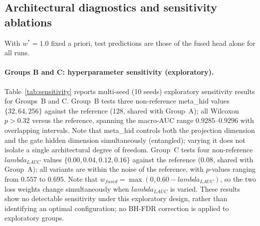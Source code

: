 \documentclass[mathematics,article,pdftex]{Definitions/mdpi}
\def\texttt#1{#1}%
\def\mathrm#1{#1}%
\def\lambda{lambda }%
\begin{document}
\subsection{Architectural diagnostics and sensitivity ablations}
\label{sec:sensitivity}
With $w^{\ast}{=}1.0$ fixed a priori, test predictions are those of the fused head alone for all runs.

\paragraph{Groups B and C: hyperparameter sensitivity (exploratory).}
Table~\ref{tab:sensitivity} reports multi-seed (10 seeds) exploratory sensitivity results for Groups~B and C. Group~B tests three non-reference \texttt{meta\_hid} values $\{32, 64, 256\}$ against the reference (128, shared with Group~A); all Wilcoxon $p{>}0.32$ versus the reference, spanning the macro-AUC range $0.9285$--$0.9296$ with overlapping intervals. Note that \texttt{meta\_hid} controls both the projection dimension and the gate hidden dimension simultaneously (entangled); varying it does not isolate a single architectural degree of freedom. Group~C tests four non-reference $\lambda_{\mathrm{LAUC}}$ values $\{0.00, 0.04, 0.12, 0.16\}$ against the reference (0.08, shared with Group~A); all variants are within the noise of the reference, with $p$-values ranging from $0.557$ to $0.695$. Note that $w_{\mathrm{fused}} = \max(0, 0.60 - \lambda_{\mathrm{LAUC}})$, so the two loss weights change simultaneously when $\lambda_{\mathrm{LAUC}}$ is varied. These results show no detectable sensitivity under this exploratory design, rather than identifying an optimal configuration; no BH-FDR correction is applied to exploratory groups.
\end{document}
